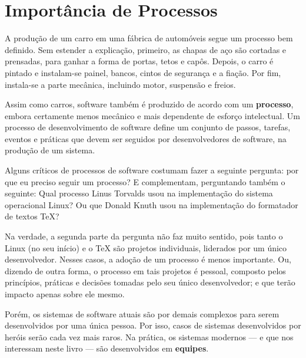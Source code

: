 \documentclass[
  11pt,
  twoside]{book}
\begin{document}
\hypertarget{importuxe2ncia-de-processos}{%
\section{Importância de Processos}\label{importuxe2ncia-de-processos}}

A produção de um carro em uma fábrica de automóveis segue um processo
bem definido. Sem estender a explicação, primeiro, as chapas de aço são
cortadas e prensadas, para ganhar a forma de portas, tetos e capôs.
Depois, o carro é pintado e instalam-se painel, bancos, cintos de
segurança e a fiação. Por fim, instala-se a parte mecânica, incluindo
motor, suspensão e freios.

Assim como carros, software também é produzido de acordo com um
\textbf{processo}, embora certamente menos mecânico e mais dependente de
esforço intelectual. Um processo de desenvolvimento de software define
um conjunto de passos, tarefas, eventos e práticas que devem ser
seguidos por desenvolvedores de software, na produção de um sistema.

   
Alguns críticos de processos de software costumam fazer a seguinte
pergunta: por que eu preciso seguir um processo? E complementam,
perguntando também o seguinte: Qual processo Linus Torvalds usou na
implementação do sistema operacional Linux? Ou que Donald Knuth usou na
implementação do formatador de textos TeX?

Na verdade, a segunda parte da pergunta não faz muito sentido, pois
tanto o Linux (no seu início) e o TeX são projetos individuais,
liderados por um único desenvolvedor. Nesses casos, a adoção de um
processo é menos importante. Ou, dizendo de outra forma, o processo em
tais projetos é pessoal, composto pelos princípios, práticas e decisões
tomadas pelo seu único desenvolvedor; e que terão impacto apenas sobre
ele mesmo.

Porém, os sistemas de software atuais são por demais complexos para
serem desenvolvidos por uma única pessoa. Por isso, casos de sistemas
desenvolvidos por heróis serão cada vez mais raros. Na prática, os
sistemas modernos --- e que nos interessam neste livro --- são
desenvolvidos em \textbf{equipes}.
\end{document}
